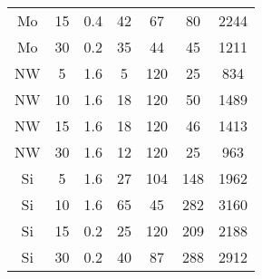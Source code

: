 \begin{table}[p]
\begin{tabular}{ccccccc}
        Mo     & 15                        & 0.4                        & 42             & 67            & 80                      & 2244             \\
        Mo     & 30                        & 0.2                        & 35             & 44            & 45                      & 1211             \\
        NW     & 5                         & 1.6                        & 5              & 120           & 25                      & 834              \\
        NW     & 10                        & 1.6                        & 18             & 120           & 50                      & 1489             \\
        NW     & 15                        & 1.6                        & 18             & 120           & 46                      & 1413             \\
        NW     & 30                        & 1.6                        & 12             & 120           & 25                      & 963              \\
        Si     & 5                         & 1.6                        & 27             & 104           & 148                     & 1962             \\
        Si     & 10                        & 1.6                        & 65             & 45            & 282                     & 3160             \\
        Si     & 15                        & 0.2                        & 25             & 120           & 209                     & 2188             \\
        Si     & 30                        & 0.2                        & 40             & 87            & 288                     & 2912
    \end{tabular}
\end{table}